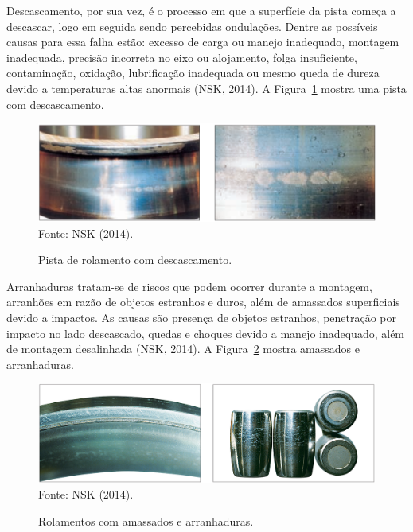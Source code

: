 \documentclass[
	12pt,				
	oneside,			
	a4paper,			
	english,			
	brazil,	
	sumario=abnt-6027-2012		
	]{abntex2ppgsi}
\begin{document}
Descascamento, por sua vez, é o processo em que a superfície da pista começa a descascar, logo em seguida sendo percebidas ondulações. Dentre as possíveis causas para essa falha estão: excesso de carga ou manejo inadequado, montagem inadequada, precisão incorreta no eixo ou alojamento, folga insuficiente, contaminação, oxidação, lubrificação inadequada ou mesmo queda de dureza devido a temperaturas altas anormais (NSK, 2014). A Figura~\ref{descascamento_nsk} mostra uma pista com descascamento.

\begin{figure}[H]
\centering
\caption {Pista de rolamento com descascamento.}
\includegraphics[width=\textwidth,height=\textheight,keepaspectratio]{descascamento_nsk} \\
Fonte: NSK (2014).
\label{descascamento_nsk}
\end{figure}

Arranhaduras tratam-se de riscos que podem ocorrer durante a montagem, arranhões em razão de objetos estranhos e duros, além de amassados superficiais devido a impactos. As causas são presença de objetos estranhos, penetração por impacto no lado descascado, quedas e choques devido a manejo inadequado, além de montagem desalinhada (NSK, 2014). A Figura~\ref{arranhaduras_nsk} mostra amassados e arranhaduras. 

\begin{figure}[H]
\centering
\caption {Rolamentos com amassados e arranhaduras.}
\includegraphics[width=\textwidth,height=\textheight,keepaspectratio]{arranhaduras_nsk} \\
Fonte: NSK (2014).
\label{arranhaduras_nsk}
\end{figure}
\end{document}
